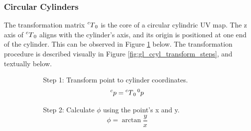 \subsubsection{Circular Cylinders}
The transformation matrix $\prescript{c}{}T_0$ is the core of a circular cylindric UV map.
The z axis of $\prescript{c}{}T_0$ aligns with the cylinder's axis, and its origin is positioned at one end of the cylinder.
This can be observed in Figure \ref{sfig:gl_ccyl_transformation} below.
The transformation procedure is described visually in Figure \ref{fig:gl_ccyl_transform_steps}, and textually below.
\begin{figure}[htb]
	\centering
	\begin{subfigure}[b]{0.3\textwidth}
		\centering
{}
		\caption{%
Step 1: Transform point to cylinder coordinates.
\begin{equation*}
	\prescript{c}{}p = \prescript{c}{}T_0 \prescript{0}{}p
\end{equation*}
}
		\label{sfig:gl_ccyl_transformation}
	\end{subfigure}
	\hfill
	\begin{subfigure}[b]{0.3\textwidth}
		\centering
{}
		\caption{%
Step 2: Calculate $\phi$ using the point's x and y.
\begin{equation*}
	\phi = \arctan \frac{y}{x}
\end{equation*}
}
	\end{subfigure}
	\hfill
	\begin{subfigure}[b]{0.3\textwidth}

\end{subfigure}
\end{figure}
